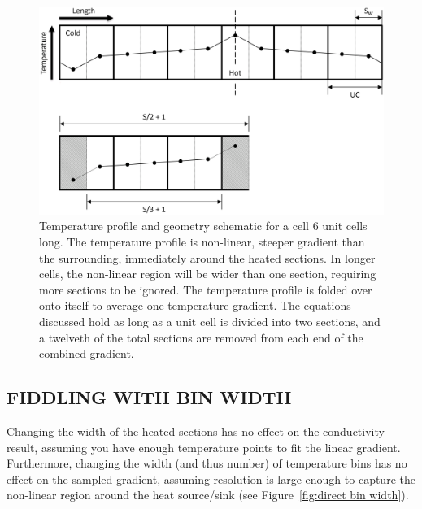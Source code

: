 
\begin{figure}[hp!]
\includegraphics[width=\linewidth]{Figures/direct_temp_pro_03.png}
\caption[direct temperature profile 3]{Temperature profile and geometry schematic for a cell 6 unit cells long. The temperature profile is non-linear, steeper gradient than the surrounding, immediately around the heated sections. In longer cells, the non-linear region will be wider than one section, requiring more sections to be ignored. The temperature profile is folded over onto itself to average one temperature gradient. The equations discussed hold as long as a unit cell is divided into two sections, and a twelveth of the total sections are removed from each end of the combined gradient.}
\label{fig:direct_temp_pro_03}
\end{figure}

\pagebreak

\subsection{\label{sec:3.DM.bin}FIDDLING WITH BIN WIDTH}

Changing the width of the heated sections has no effect on the conductivity result, assuming you have enough temperature points to fit the linear gradient. Furthermore, changing the width (and thus number) of temperature bins has no effect on the sampled gradient, assuming resolution is large enough to capture the non-linear region around the heat source/sink (see Figure~\ref{fig:direct bin width}).

